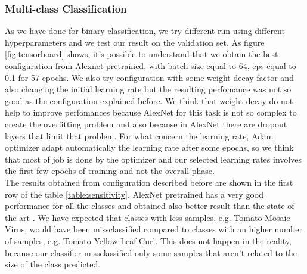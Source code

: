 \subsubsection{Multi-class Classification}
As we have done for binary classification, we try different run using different hyperparameters and we test our result on the validation set. As figure \ref{fig:tensorboard} shows, it's possible to understand that we obtain the best configuration from Alexnet pretrained, with batch size equal to 64, eps equal to 0.1 for 57 epochs. We also try configuration with some weight decay factor and also changing the initial learning rate but the resulting perfomance was not so good as the configuration explained before. We think that weight decay do not help to improve perfomances because AlexNet for this task is not so complex to create the overfitting problem and also because in AlexNet there are dropout layers that limit that problem. For what concern the learning rate, Adam optimizer \cite{ref32} adapt automatically the learning rate after some epochs, so we think that most of job is done by the optimizer and our selected learning rates involves the first few epochs of training and not the overall phase.
\\The results obtained from configuration described before are shown in the first row of the table \ref{table:sensitivity}. AlexNet pretrained has a very good performance for all the classes and obtained also better result than the state of the art \cite{ref11}. We have expected that classes with less samples, e.g. Tomato Mosaic Virus, would have been missclassified compared to classes with an higher number of samples, e.g. Tomato Yellow Leaf Curl. This does not happen in the reality, because our classifier missclassified only some samples that aren't related to the size of the class predicted.
